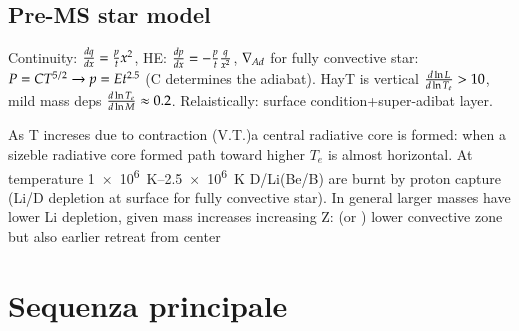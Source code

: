\subsection{Pre-MS star model}

Continuity: $\TDy{x}{q}=\frac{p}{t}x^2$, HE: $\TDy{x}{p}=-\frac{p}{t}\frac{q}{x^2}$, $\nad$ for fully convective star: $P=CT\expy{5/2}\to p=Et\expy{2.5}$ (C determines the adiabat).
HayT is vertical $\TDly{T_e}{L}>10$, mild mass deps $\TDly{M}{T_e}\approx0.2$. Relaistically: surface condition+super-adibat layer.

As T increses due to contraction (V.T.)a central radiative core is formed: when a sizeble radiative core formed path toward higher $T_e$ is almost horizontal.
At temperature \SIrange{1e6}{2.5e6}{\kelvin} D/Li(Be/B) are burnt by proton capture (Li/D depletion at surface for fully convective star).
In general larger masses have lower Li depletion, given mass increases increasing Z: (or ) lower convective zone but also earlier retreat from center

\section{Sequenza principale}

